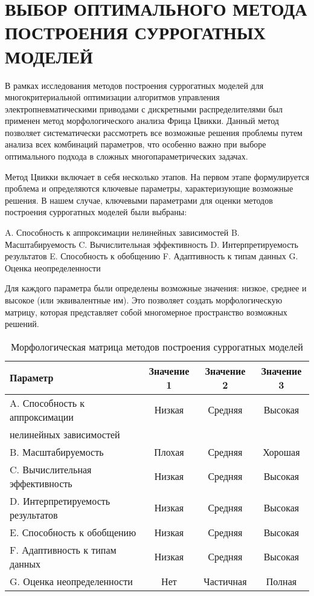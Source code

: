 \chapter{ВЫБОР ОПТИМАЛЬНОГО МЕТОДА ПОСТРОЕНИЯ СУРРОГАТНЫХ МОДЕЛЕЙ}\label{app:choosing-the-best-surrogate-model-method}

В рамках исследования методов построения суррогатных моделей
для многокритериальной оптимизации алгоритмов управления
электропневматическими приводами с дискретными распределителями
был применен метод морфологического анализа Фрица Цвикки. Данный
метод позволяет систематически рассмотреть все возможные решения
проблемы путем анализа всех комбинаций параметров, что особенно важно
при выборе оптимального подхода в сложных многопараметрических задачах.

Метод Цвикки включает в себя несколько этапов. На первом этапе
формулируется проблема и определяются ключевые параметры,
характеризующие возможные решения. В нашем случае, ключевыми
параметрами для оценки методов построения суррогатных моделей были выбраны:

A. Способность к аппроксимации нелинейных зависимостей
B. Масштабируемость
C. Вычислительная эффективность
D. Интерпретируемость результатов
E. Способность к обобщению
F. Адаптивность к типам данных
G. Оценка неопределенности

Для каждого параметра были определены возможные значения:
низкое, среднее и высокое (или эквивалентные им).
Это позволяет создать морфологическую матрицу,
которая представляет собой многомерное пространство возможных решений.

\begin{table}[h]
	\centering
	\caption{Морфологическая матрица методов построения суррогатных моделей}
	\begin{tabular}{lccc}
		\midrule
		Параметр                          & Значение 1 & Значение 2 & Значение 3 \\
		\midrule
		A. Способность к аппроксимации    & Низкая     & Средняя    & Высокая    \\
		нелинейных зависимостей           &            &            &            \\

		B. Масштабируемость               & Плохая     & Средняя    & Хорошая    \\
		C. Вычислительная эффективность   & Низкая     & Средняя    & Высокая    \\
		D. Интерпретируемость результатов & Низкая     & Средняя    & Высокая    \\
		E. Способность к обобщению        & Низкая     & Средняя    & Высокая    \\
		F. Адаптивность к типам данных    & Низкая     & Средняя    & Высокая    \\
		G. Оценка неопределенности        & Нет        & Частичная  & Полная     \\
		\midrule
	\end{tabular}
	\label{tab:morphological_matrix}
\end{table}

